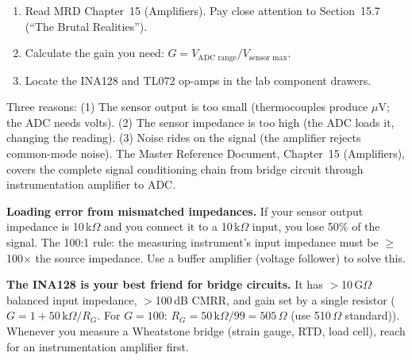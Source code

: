 \documentclass[11pt,letterpaper]{article}
\begin{document}
\begin{tcolorbox}[colback=minesblue!3, colframe=minesblue!40, boxrule=0.5pt, arc=2pt, left=6pt, right=6pt, top=3pt, bottom=3pt, fonttitle=\small\bfseries\color{minesblue}, title={Before You Start: Module 7}]
\small
\begin{enumerate}[nosep,leftmargin=*]
\item Read MRD Chapter~15 (Amplifiers). Pay close attention to Section~15.7 (``The Brutal Realities'').
\item Calculate the gain you need: $G = V_{\text{ADC range}} / V_{\text{sensor max}}$.
\item Locate the INA128 and TL072 op-amps in the lab component drawers.
\end{enumerate}
\end{tcolorbox}

\begin{faqbox}
Three reasons: (1) The sensor output is too small (thermocouples produce $\mu$V; the ADC needs volts). (2) The sensor impedance is too high (the ADC loads it, changing the reading). (3) Noise rides on the signal (the amplifier rejects common-mode noise). The Master Reference Document, Chapter~15 (Amplifiers), covers the complete signal conditioning chain from bridge circuit through instrumentation amplifier to ADC.
\end{faqbox}

\begin{warnbox}
\textbf{Loading error from mismatched impedances.} If your sensor output impedance is 10\,k$\Omega$ and you connect it to a 10\,k$\Omega$ input, you lose 50\% of the signal. The 100:1 rule: the measuring instrument's input impedance must be $\geq$100$\times$ the source impedance. Use a buffer amplifier (voltage follower) to solve this.
\end{warnbox}

\begin{protip}
\textbf{The INA128 is your best friend for bridge circuits.} It has $>$10\,G$\Omega$ balanced input impedance, $>$100\,dB CMRR, and gain set by a single resistor ($G = 1 + 50\,\text{k}\Omega/R_G$. For $G=100$: $R_G = 50\,\text{k}\Omega/99 = 505\,\Omega$ (use 510\,$\Omega$ standard)). Whenever you measure a Wheatstone bridge (strain gauge, RTD, load cell), reach for an instrumentation amplifier first.
\end{protip}

\end{document}
